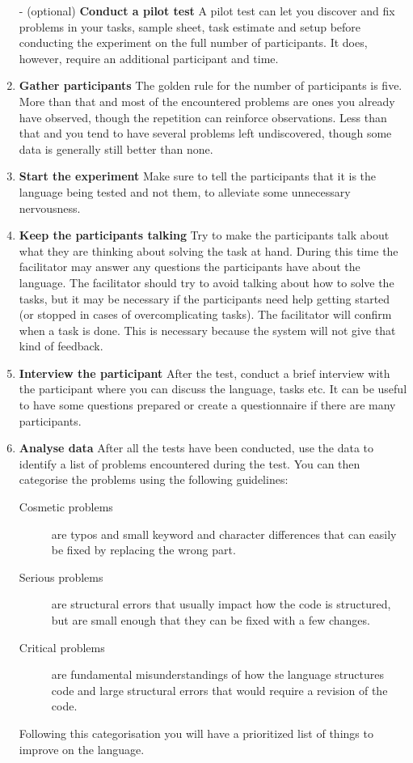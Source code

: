 \documentclass[preprint,10pt]{sigplanconf}
\begin{document}
\begin{enumerate}
\item[-] (optional) \textbf{Conduct a pilot test} A pilot test can let you discover and fix problems in your tasks, sample sheet, task estimate and setup before conducting the experiment on the full number of participants. It does, however, require an additional participant and time.
\item \textbf{Gather participants} The golden rule for the number of participants is five. More than that and most of the encountered problems are ones you already have observed, though the repetition can reinforce observations. Less than that and you tend to have several problems left undiscovered, though some data is generally still better than none.
\item \textbf{Start the experiment} Make sure to tell the participants that it is the language being tested and not them, to alleviate some unnecessary nervousness.
\item \textbf{Keep the participants talking} Try to make the participants talk about what they are thinking about solving the task at hand. During this time the facilitator may answer any questions the participants have about the language. The facilitator should try to avoid talking about how to solve the tasks, but it may be necessary if the participants need help getting started (or stopped in cases of overcomplicating tasks). The facilitator will confirm when a task is done. This is necessary because the system will not give that kind of feedback.
\item \textbf{Interview the participant} After the test, conduct a brief interview with the participant where you can discuss the language, tasks etc. It can be useful to have some questions prepared or create a questionnaire if there are many participants.
\item \textbf{Analyse data} After all the tests have been conducted, use the data to identify a list of problems encountered during the test. You can then categorise the problems using the following guidelines:
\begin{description}
\item[Cosmetic problems] are typos and small keyword and character differences that can easily be fixed by replacing the wrong part.
\item[Serious problems] are structural errors that usually impact how the code is structured, but are small enough that they can be fixed with a few changes.
\item[Critical problems] are fundamental misunderstandings of how the language structures code and large structural errors that would require a revision of the code.
\end{description}
Following this categorisation you will have a prioritized list of things to improve on the language.
\end{enumerate}
\end{document}
